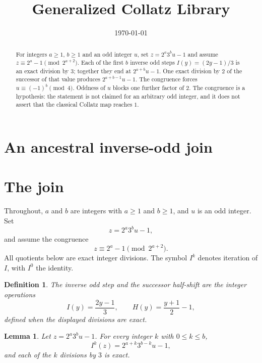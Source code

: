 \documentclass[11pt,letterpaper]{article}
\title{Generalized Collatz Library}
\author{}
\date{\today}
\newtheorem{lemma}[theorem]{Lemma}
\newtheorem{definition}[theorem]{Definition}
\begin{document}
\maketitle
\section*{An ancestral inverse-odd join}

\begin{abstract}
For integers \(a\ge 1\), \(b\ge 1\) and an odd integer \(u\), set
\(z=2^{a}3^{b}u-1\) and assume \(z\equiv 2^{a}-1\pmod{2^{a+2}}\).
Each of the first \(b\) inverse odd steps \(I(y)=(2y-1)/3\) is an
exact division by \(3\); together they end at \(2^{a+b}u-1\). One exact
division by \(2\) of the successor of that value produces
\(2^{a+b-1}u-1\). The congruence forces \(u\equiv(-1)^{b}\pmod{4}\).
Oddness of \(u\) blocks one further factor of \(2\). The congruence is a
hypothesis: the statement is not claimed for an arbitrary odd integer, and
it does not assert that the classical Collatz map reaches \(1\).
\end{abstract}

\section{The join}

Throughout, \(a\) and \(b\) are integers with \(a\ge 1\) and \(b\ge 1\), and
\(u\) is an odd integer. Set
\[
z=2^{a}3^{b}u-1,
\]
and assume the congruence
\begin{equation}
\label{eq:ancestral-congruence}
z\equiv 2^{a}-1\pmod{2^{a+2}}.
\end{equation}
All quotients below are exact integer divisions. The symbol \(I^{k}\) denotes
iteration of \(I\), with \(I^{0}\) the identity.

\begin{definition}
\label{def:ancestral-steps}
The inverse odd step and the successor half-shift are the integer operations
\[
I(y)=\frac{2y-1}{3},
\qquad
H(y)=\frac{y+1}{2}-1,
\]
defined when the displayed divisions are exact.
\end{definition}

\begin{lemma}
\label{lem:ancestral-closed}
Let \(z=2^{a}3^{b}u-1\). For every integer \(k\) with \(0\le k\le b\),
\[
I^{k}(z)=2^{a+k}3^{b-k}u-1,
\]
and each of the \(k\) divisions by \(3\) is exact.
\end{lemma}
\end{document}
